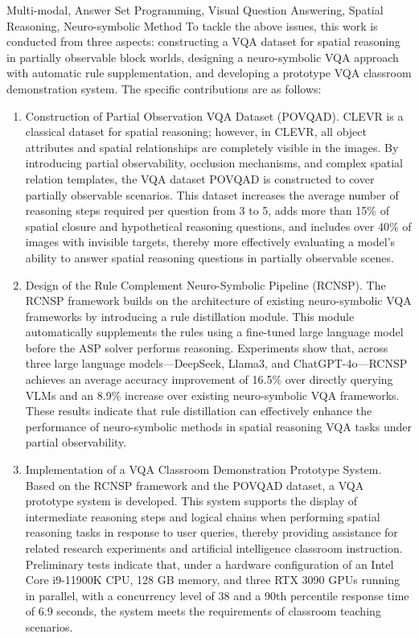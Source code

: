 \begin{englishabstract}{Multi-modal, Answer Set Programming, Visual Question Answering, Spatial Reasoning, Neuro-symbolic Method}
To tackle the above issues, this work is conducted from three aspects: constructing a VQA dataset for spatial reasoning in partially observable block worlds, designing a neuro-symbolic VQA approach with automatic rule supplementation, and developing a prototype VQA classroom demonstration system. The specific contributions are as follows:
\begin{enumerate}[itemsep=0pt, parsep=0pt]
\item Construction of Partial Observation VQA Dataset (POVQAD).
CLEVR is a classical dataset for spatial reasoning; however, in CLEVR, 
all object attributes and spatial relationships are completely visible in the images. 
By introducing partial observability, occlusion mechanisms, and complex spatial relation templates, 
the VQA dataset POVQAD is constructed to cover partially observable scenarios. 
This dataset increases the average number of reasoning steps required per question from 3 to 5, 
adds more than 15\% of spatial closure and hypothetical reasoning questions, 
and includes over 40\% of images with invisible targets, 
thereby more effectively evaluating a model’s ability to answer spatial reasoning questions in partially observable scenes.
\item Design of the Rule Complement Neuro-Symbolic Pipeline (RCNSP).
The RCNSP framework builds on the architecture of existing neuro-symbolic VQA frameworks by introducing 
a rule distillation module. This module automatically supplements the rules using a fine-tuned large language 
model before the ASP solver performs reasoning. Experiments show that, across three large language models—DeepSeek, 
Llama3, and ChatGPT-4o—RCNSP achieves an average accuracy improvement 
of 16.5\% over directly querying VLMs and an 8.9\% increase over existing neuro-symbolic VQA frameworks. 
These results indicate that rule distillation can effectively enhance the performance of neuro-symbolic methods 
in spatial reasoning VQA tasks under partial observability.
\item Implementation of a VQA Classroom Demonstration Prototype System. 
Based on the RCNSP framework and the POVQAD dataset, a VQA prototype system is developed. 
This system supports the display of intermediate reasoning steps and logical chains when performing spatial reasoning
 tasks in response to user queries, thereby providing assistance for related research experiments and artificial 
 intelligence classroom instruction. Preliminary tests indicate that, under a hardware configuration of 
 an Intel Core i9-11900K CPU, 128 GB memory, and three RTX 3090 GPUs running in parallel, 
 with a concurrency level of 38 and a 90th percentile response time of 6.9 seconds, 
 the system meets the requirements of classroom teaching scenarios.
\end{enumerate}
\end{englishabstract}

\tableofcontents
\listofothers
